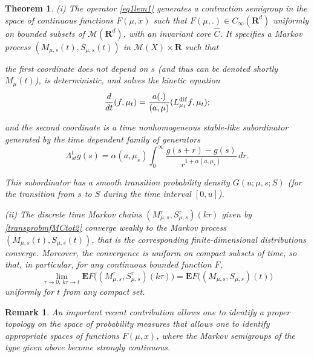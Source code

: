 \documentclass[12pt]{article}
\def\MC{\mathcal{M}}
\def\E{\mathbf{E}}
\def\R{\mathbf{R}}
\def\al{\alpha}
\newcommand{\La}{\Lambda}
\numberwithin{equation}{section}
\newtheorem{theorem}{Theorem}
\newtheorem{remark}{Remark}
\begin{document}
\begin{theorem}
\label{th1}
(i) The operator \eqref{eq1lem1} generates a contraction semigroup in
the space of continuous functions $F(\mu,x)$ such that $F(\mu,.)\in C_{\infty}(\R^d)$ uniformly
on bounded subsets of $\MC(\R^d)$, with an invariant core $\hat C$.
It specifies a Markov process
$(M_{\mu,s}(t),S_{\mu,s}(t))$  in $\MC(X)\times \R$ such that

the first coordinate does not depend on $s$ (and thus can be denoted shortly $M_{\mu}(t)$),
is deterministic, and solves the kinetic equation
\begin{equation}
\label{eqkin1}
\frac{d}{dt}(f, \mu_t) = \frac{a(.)}{(a,\mu)}(L^{\rm dif}_{\mu_t}f,\mu_t);
\end{equation}

and the second coordinate is a time nonhomogeneous stable-like subordinator
generated by the time dependent family of generators
 \begin{equation}
\label{eq1th1}
\La^t_{st} g(s)=\al (a,\mu_s) \int_0^{\infty} \frac {g(s+r)-g(s)}{r^{1+\al (a, \mu_s)}} \, dr.
\end{equation}

This subordinator has a smooth transition probability density  $G(u;\mu,s; S)$
(for the transition from $s$ to $S$ during the time interval $[0,u]$).

(ii) The discrete time Markov chains $(M^{\tau}_{\mu,s},S^{\tau}_{\mu,s})(k\tau)$
given by \eqref{transprobmfMCtot2} converge weakly to the Markov process $(M_{\mu,s}(t),S_{\mu,s}(t))$,
that is the corresponding finite-dimensional distributions converge. Moreover, the convergence is uniform on
compact subsets of time, so that, in particular, for any continuous bounded function $F$,
\begin{equation}
\label{eq2th1}
\lim_{\tau\to 0, \, k\tau\to t}\E F\bigl((M^{\tau}_{\mu,s},S^{\tau}_{\mu,s})(k\tau)\bigr)
=\E F\bigl((M_{\mu,s},S_{\mu,s})(t)\bigr)
\end{equation}
uniformly for $t$ from any compact set.
\end{theorem}

\begin{remark}
An important recent contribution \cite{GoldRock} allows one to identify a proper topology
on the space of probability measures that allows one to identify appropriate spaces of
functions $F(\mu,x)$, where the Markov semigroups of the type given above become strongly continuous.
\end{remark}
\end{document}
